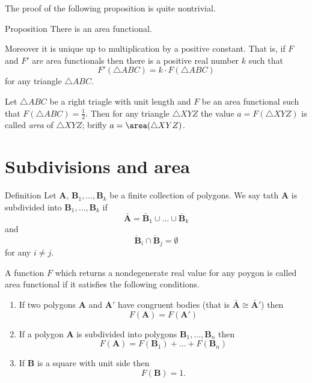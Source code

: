 {The proof of the following proposition is quite nontrivial.

\begin{thm}{Proposition}
There is an area functional. 

Moreover it is unique up to multiplication by a positive constant. 
That is, if $F$ and $F'$ are area functionals then there is a positive real number $k$ such that 
\[F'(\triangle ABC)=k\cdot F(\triangle ABC)\]
for any triangle $\triangle ABC$.
\end{thm}

Let $\triangle ABC$ be a right triagle with unit length
and $F$ be an area functional such that $F(\triangle ABC)=\tfrac12$.
Then for any triangle $\triangle XYZ$ the value $a=F(\triangle XYZ)$ is called \emph{area} of $\triangle XYZ$;
brifly $a=\area(\triangle XYZ)$.















\section*{Subdivisions and area}

\begin{thm}{Definition}
Let $\bm{A}$, $\bm{B}_1,\dots,\bm{B}_k$
be a finite collection of polygons.
We say tath $\bm{A}$ 
is subdivided into $\bm{B}_1,\dots,\bm{B}_k$
if 
\[\bar{\bm{A}}=\bar{\bm{B}}_1\cup\dots\cup\bar{\bm{B}}_k\]
and 
\[\mathring{\bm{B}}_i\cap\mathring{\bm{B}}_j=\emptyset\]
for any $i\ne j$.
\end{thm}

A function $F$ which returns a nondegenerate real value for any poygon 
is called area functional if it satisfies the following conditions.

\begin{enumerate}
\item If  two polygons $\bm{A}$ and $\bm{A}'$ have congruent bodies (that is $\bar{\bm{A}}\cong \bar{\bm{A}}'$)
then 
\[F(\bm{A})=F(\bm{A}')\]
\item If a polygon $\bm{A}$ is subdivided into polygons $\bm{B}_1, \dots,\bm{B}_n$
then 
\[F(\bm{A})=F(\bm{B}_1)+\dots+F(\bm{B}_n)\]
\item If $\bm{B}$ is a square with unit side then 
\[F(\bm{B})=1.\]
\end{enumerate}

}

